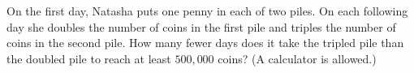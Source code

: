 On the first day, Natasha puts one penny in each of two piles. On each following day she doubles the number of coins in the first pile and triples the number of coins in the second pile. How many fewer days does it take the tripled pile than the doubled pile to reach at least $500{,}000$ coins? (A calculator is allowed.)
